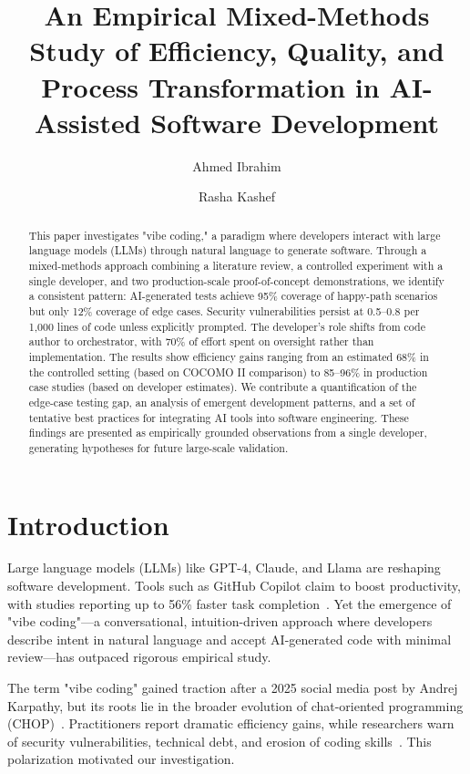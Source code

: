 \documentclass[sigconf]{acmart}
\title[Vibe Coding vs. Traditional Development]{An Empirical Mixed-Methods Study of Efficiency, Quality, and Process Transformation in AI-Assisted Software Development}
\author{Ahmed Ibrahim}
\affiliation{%
  \institution{Wilfrid Laurier University (WLU)}
  \city{Waterloo}
  \state{Ontario}
  \country{Canada}
}
\author{Rasha Kashef}
\affiliation{%
  \institution{Toronto Metropolitan University (TMU)}
  \city{Toronto}
  \state{Ontario}
  \country{Canada}
}
\begin{document}
\pagestyle{plain}

\begin{abstract}
This paper investigates "vibe coding," a paradigm where developers interact with large language models (LLMs) through natural language to generate software. Through a mixed-methods approach combining a literature review, a controlled experiment with a single developer, and two production-scale proof-of-concept demonstrations, we identify a consistent pattern: AI-generated tests achieve 95\% coverage of happy-path scenarios but only 12\% coverage of edge cases. Security vulnerabilities persist at 0.5–0.8 per 1,000 lines of code unless explicitly prompted. The developer's role shifts from code author to orchestrator, with 70\% of effort spent on oversight rather than implementation. The results show efficiency gains ranging from an estimated 68\% in the controlled setting (based on COCOMO II comparison) to 85–96\% in production case studies (based on developer estimates). We contribute a quantification of the edge-case testing gap, an analysis of emergent development patterns, and a set of tentative best practices for integrating AI tools into software engineering. These findings are presented as empirically grounded observations from a single developer, generating hypotheses for future large-scale validation.
\end{abstract}

\maketitle

\section{Introduction}

Large language models (LLMs) like GPT-4, Claude, and Llama are reshaping software development. Tools such as GitHub Copilot claim to boost productivity, with studies reporting up to 56\% faster task completion~\cite{peng2023impact}. Yet the emergence of "vibe coding"—a conversational, intuition-driven approach where developers describe intent in natural language and accept AI-generated code with minimal review—has outpaced rigorous empirical study.

The term "vibe coding" gained traction after a 2025 social media post by Andrej Karpathy, but its roots lie in the broader evolution of chat-oriented programming (CHOP)~\cite{zamfiroiu2025chop}. Practitioners report dramatic efficiency gains, while researchers warn of security vulnerabilities, technical debt, and erosion of coding skills~\cite{sandoval2023lost, dakhel2023github}. This polarization motivated our investigation.
\end{document}
